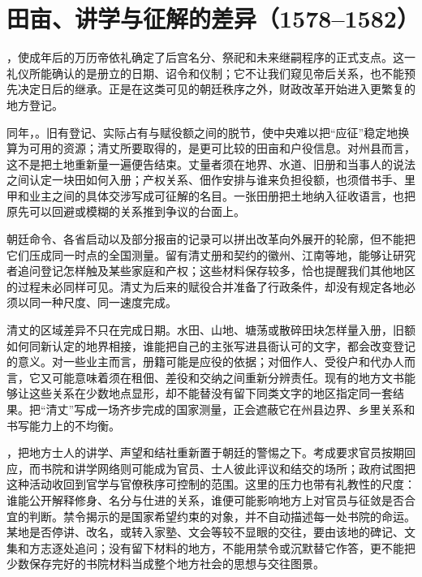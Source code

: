 \section{田亩、讲学与征解的差异（1578--1582）}

，使成年后的万历帝依礼确定了后宫名分、祭祀和未来继嗣程序的正式支点。这一礼仪所能确认的是册立的日期、诏令和仪制；它不让我们窥见帝后关系，也不能预先决定日后的继承。正是在这类可见的朝廷秩序之外，财政改革开始进入更繁复的地方登记。

同年，。旧有登记、实际占有与赋役额之间的脱节，使中央难以把“应征”稳定地换算为可用的资源；清丈所要取得的，是更可比较的田亩和户役信息。对州县而言，这不是把土地重新量一遍便告结束。丈量者须在地界、水道、旧册和当事人的说法之间认定一块田如何入册；产权关系、佃作安排与谁来负担役额，也须借书手、里甲和业主之间的具体交涉写成可征解的名目。一张田册把土地纳入征收语言，也把原先可以回避或模糊的关系推到争议的台面上。

朝廷命令、各省启动以及部分报亩的记录可以拼出改革向外展开的轮廓，但不能把它们压成同一时点的全国测量。留有清丈册和契约的徽州、江南等地，能够让研究者追问登记怎样触及某些家庭和产权；这些材料保存较多，恰也提醒我们其他地区的过程未必同样可见。清丈为后来的赋役合并准备了行政条件，却没有规定各地必须以同一种尺度、同一速度完成。

清丈的区域差异不只在完成日期。水田、山地、塘荡或散碎田块怎样量入册，旧额如何同新认定的地界相接，谁能把自己的主张写进县衙认可的文字，都会改变登记的意义。对一些业主而言，册籍可能是应役的依据；对佃作人、受役户和代办人而言，它又可能意味着须在租佃、差役和交纳之间重新分辨责任。现有的地方文书能够让这些关系在少数地点显形，却不能替没有留下同类文字的地区指定同一套结果。把“清丈”写成一场齐步完成的国家测量，正会遮蔽它在州县边界、乡里关系和书写能力上的不均衡。

，把地方士人的讲学、声望和结社重新置于朝廷的警惕之下。考成要求官员按期回应，而书院和讲学网络则可能成为官员、士人彼此评议和结交的场所；政府试图把这种活动收回到官学与官僚秩序可控制的范围。这里的压力也带有礼教性的尺度：谁能公开解释修身、名分与仕进的关系，谁便可能影响地方上对官员与征敛是否合宜的判断。禁令揭示的是国家希望约束的对象，并不自动描述每一处书院的命运。某地是否停讲、改名，或转入家塾、文会等较不显眼的交往，要由该地的碑记、文集和方志逐处追问；没有留下材料的地方，不能用禁令或沉默替它作答，更不能把少数保存完好的书院材料当成整个地方社会的思想与交往图景。

